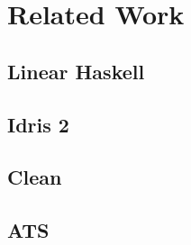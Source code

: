 \chapter{Related Work}\label{sec:relatedwork}

\section{Linear Haskell}

\section{Idris 2}

\section{Clean}

\section{ATS}